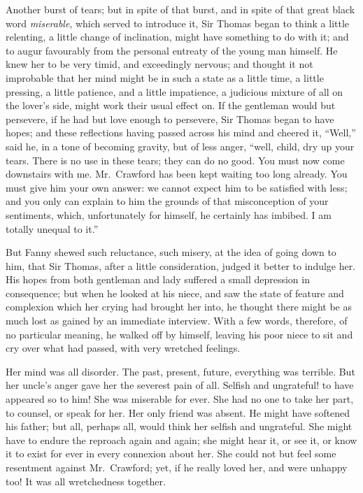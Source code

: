 Another burst of tears; but in spite of that burst,
and in spite of that great black word \emph{miserable},
which served to introduce it, Sir Thomas began to think
a little relenting, a little change of inclination,
might have something to do with it; and to augur favourably
from the personal entreaty of the young man himself.
He knew her to be very timid, and exceedingly nervous;
and thought it not improbable that her mind might be
in such a state as a little time, a little pressing,
a little patience, and a little impatience, a judicious
mixture of all on the lover's side, might work their
usual effect on.  If the gentleman would but persevere,
if he had but love enough to persevere, Sir Thomas began
to have hopes; and these reflections having passed across
his mind and cheered it, ``Well,'' said he, in a tone
of becoming gravity, but of less anger, ``well, child,
dry up your tears.  There is no use in these tears;
they can do no good.  You must now come downstairs with me.
Mr.\ Crawford has been kept waiting too long already.
You must give him your own answer:  we cannot expect him
to be satisfied with less; and you only can explain to him
the grounds of that misconception of your sentiments, which,
unfortunately for himself, he certainly has imbibed.  I am
totally unequal to it.''

But Fanny shewed such reluctance, such misery, at the
idea of going down to him, that Sir Thomas, after a
little consideration, judged it better to indulge her.
His hopes from both gentleman and lady suffered a small
depression in consequence; but when he looked at his niece,
and saw the state of feature and complexion which her
crying had brought her into, he thought there might
be as much lost as gained by an immediate interview.
With a few words, therefore, of no particular meaning,
he walked off by himself, leaving his poor niece to sit
and cry over what had passed, with very wretched feelings.

Her mind was all disorder.  The past, present, future,
everything was terrible.  But her uncle's anger gave
her the severest pain of all.  Selfish and ungrateful!
to have appeared so to him!  She was miserable for ever.
She had no one to take her part, to counsel, or speak
for her.  Her only friend was absent.  He might have
softened his father; but all, perhaps all, would think
her selfish and ungrateful.  She might have to endure
the reproach again and again; she might hear it, or see it,
or know it to exist for ever in every connexion about her.
She could not but feel some resentment against Mr.\ Crawford;
yet, if he really loved her, and were unhappy too!
It was all wretchedness together.

